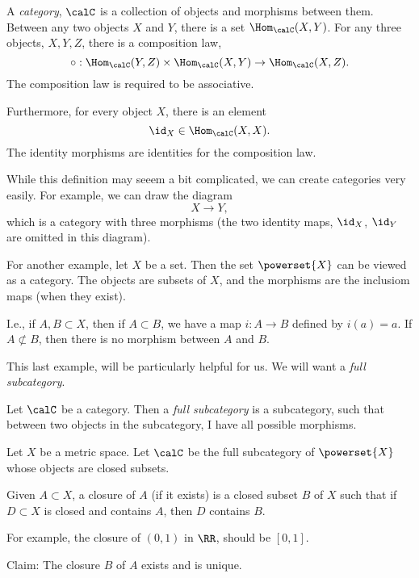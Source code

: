\documentclass{article}
\begin{document}
\begin{definition}
    A \emph{category}, $\calC$ is a collection of objects
    and morphisms between them. Between any two objects 
    $X$ and $Y$, there is a set $\Hom_{\calC}(X,Y)$.
    For any three objects, $X,Y,Z$, there is a composition law, 
    \[ \circ : \Hom_{\calC}(Y,Z)\times \Hom_{\calC}(X,Y) \to 
    \Hom_{\calC}(X,Z).\]
    The composition law is required to be associative.

    Furthermore, for every object $X$, there is an element
    \[\id_X \in \Hom_{\calC}(X,X).\]
    The identity morphisms are identities for the composition
    law.
\end{definition}

While this definition may seeem a bit complicated, we 
can create categories very easily. For example, we can
draw the diagram 
\[X\to Y,\]
which is a category with three morphisms (the two identity maps,
$\id_X$, $\id_Y$
are omitted in this diagram).

For another example, let $X$ be a set. Then 
the set $\powerset{X}$ can be viewed as a category.
The objects are subsets of $X$, and the morphisms 
are the inclusiom maps (when they exist).

I.e., if $A,B\subset X$, then if $A\subset B$, we have a map
$i:A\to B$ defined by $i(a)=a$. If $A\not\subset B$, then 
there is no morphism between $A$ and $B$.

This last example, will be particularly helpful for us.
We will want a \emph{full subcategory}.

\begin{definition}
    Let $\calC$ be a category. Then a \emph{full subcategory}
    is a subcategory, such that between two objects in the 
    subcategory, I have all possible morphisms.
\end{definition}

Let $X$ be a metric space. Let $\calC$ be the full
subcategory of $\powerset{X}$ whose objects are closed subsets.

\begin{definition}
Given $A\subset X$, a closure of $A$ (if it exists) 
is a closed subset $B$ of $X$
such that if $D\subset X$ is closed and contains 
$A$, then $D$ contains $B$.
\end{definition}

For example, the closure of $(0,1)$ in $\RR$, should be $[0,1]$.

Claim: The closure $B$ of $A$ exists and is unique.
\end{document}
